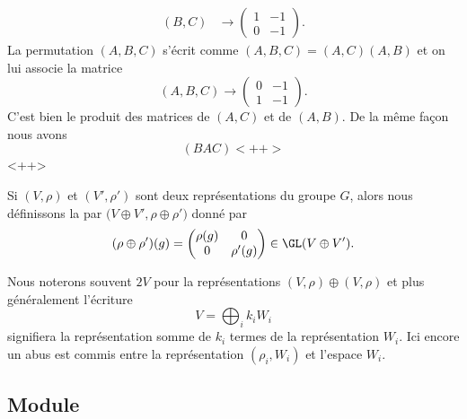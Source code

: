 \begin{example}
\begin{subequations}
\begin{align}
            (B,C)&\to\begin{pmatrix}
                1    &   -1    \\
                0    &   -1
            \end{pmatrix}.
        \end{align}
    \end{subequations}
    La permutation \( (A,B,C)\) s'écrit comme \( (A,B,C)=(A,C)(A,B)\) et on lui associe la matrice
    \begin{equation}
        (A,B,C)\to\begin{pmatrix}
            0    &   -1    \\
            1    &   -1
        \end{pmatrix}.
    \end{equation}
    C'est bien le produit des matrices de \( (A,C)\) et de \( (A,B)\). De la même façon nous avons
    \begin{equation}
        (BAC)<++>
    \end{equation}
    <++>
\end{example}

Si \( (V,\rho)\) et \( (V',\rho')\) sont deux représentations du groupe \( G\), alors nous définissons la  par \( \big( V\oplus V',\rho\oplus\rho' \big)\) donné par
\begin{equation}
    (\rho\oplus\rho')(g)=\begin{pmatrix}
        \rho(g)    &   0    \\
        0    &   \rho'(g)
    \end{pmatrix}\in \GL(V\oplus V').
\end{equation}

Nous noterons souvent \( 2V\) pour la représentations \( (V,\rho)\oplus (V,\rho)\) et plus généralement l'écriture
\begin{equation}
    V=\bigoplus_i k_iW_i
\end{equation}
signifiera la représentation somme de \( k_i\) termes de la représentation \( W_i\). Ici encore un abus est commis entre la représentation \( (\rho_i,W_i)\) et l'espace \( W_i\).

\subsection{Module}

